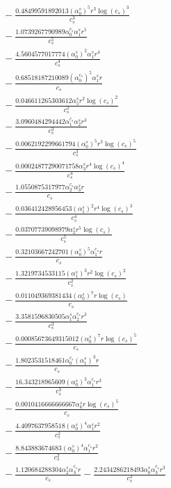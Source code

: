 \documentclass[10pt]{article}
\begin{document}
\begin{align*}
&{}  - \frac{0.48499591892013 \left(\alpha_{0}^s\right)^{5} r^{3} \log{\left(c_{s} \right)}^{3}}{c_{s}^{3}} \\
&{}  - \frac{1.0739267790989 \alpha_{0}^{c_s} \alpha_{1}^s r^{5}}{c_{s}^{5}} \\
&{}  - \frac{4.5604577017774 \left(\alpha_{0}^s\right)^{2} \alpha_{1}^s r^{4}}{c_{s}^{4}} \\
&{}  - \frac{0.68518187210089 \left(\alpha_{0}^{c_s}\right)^{5} \alpha_{1}^s r}{c_{s}} \\
&{}  - \frac{0.046611265303612 \alpha_{5}^s r^{2} \log{\left(c_{s} \right)}^{2}}{c_{s}^{2}} \\
&{}  - \frac{3.0960484294442 \alpha_{1}^{c_s} \alpha_{2}^s r^{3}}{c_{s}^{3}} \\
&{}  - \frac{0.0062192299661794 \left(\alpha_{0}^s\right)^{5} r^{3} \log{\left(c_{s} \right)}^{5}}{c_{s}^{3}} \\
&{}  - \frac{0.00024877290071758 \alpha_{3}^s r^{4} \log{\left(c_{s} \right)}^{4}}{c_{s}^{4}} \\
&{}  - \frac{1.0550875317977 \alpha_{2}^{c_s} \alpha_{3}^s r}{c_{s}} \\
&{}  - \frac{0.036412428956453 \left(\alpha_{1}^s\right)^{2} r^{4} \log{\left(c_{s} \right)}^{3}}{c_{s}^{4}} \\
&{}  - \frac{0.03707739098979 \alpha_{2}^s r^{5} \log{\left(c_{s} \right)}}{c_{s}^{5}} \\
&{}  - \frac{0.32103667242701 \left(\alpha_{0}^s\right)^{5} \alpha_{1}^{c_s} r}{c_{s}} \\
&{}  - \frac{1.3219734533115 \left(\alpha_{1}^s\right)^{3} r^{2} \log{\left(c_{s} \right)}^{2}}{c_{s}^{2}} \\
&{}  - \frac{0.011049369381434 \left(\alpha_{0}^s\right)^{7} r \log{\left(c_{s} \right)}}{c_{s}} \\
&{}  - \frac{3.3581596830505 \alpha_{1}^s \alpha_{2}^{c_s} r^{3}}{c_{s}^{3}} \\
&{}  - \frac{0.00085673649315012 \left(\alpha_{0}^s\right)^{7} r \log{\left(c_{s} \right)}^{5}}{c_{s}} \\
&{}  - \frac{1.8023531518461 \alpha_{0}^{c_s} \left(\alpha_{1}^s\right)^{3} r}{c_{s}} \\
&{}  - \frac{16.343218965609 \left(\alpha_{0}^s\right)^{3} \alpha_{1}^{c_s} r^{3}}{c_{s}^{3}} \\
&{}  - \frac{0.0010416666666667 \alpha_{6}^s r \log{\left(c_{s} \right)}^{5}}{c_{s}} \\
&{}  - \frac{4.4097637958518 \left(\alpha_{0}^s\right)^{4} \alpha_{1}^s r^{2}}{c_{s}^{2}} \\
&{}  - \frac{8.843883674683 \left(\alpha_{0}^s\right)^{4} \alpha_{1}^{c_s} r^{2}}{c_{s}^{2}} \\
&{}  - \frac{1.120684288304 \alpha_{2}^s \alpha_{3}^{c_s} r}{c_{s}} - \frac{2.2434286218493 \alpha_{0}^s \alpha_{3}^{c_s} r^{3}}{c_{s}^{3}}
\end{align*}
\end{document}
